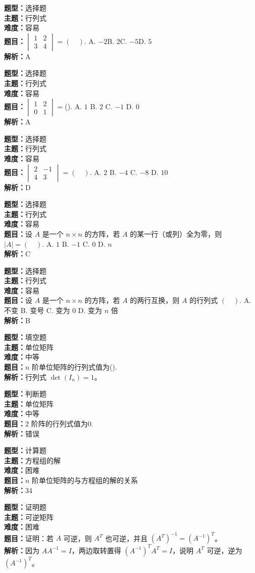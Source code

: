 \documentclass{ctexart}
\newenvironment{question}[5]{%
	\noindent\textbf{题型：}#1\\
	\textbf{主题：}#2\\
	\textbf{难度：}#3\\
	\textbf{题目：}#4\\
	\textbf{解析：}#5\\
	\vspace{1em}
}{}
\begin{document}
	\begin{question}
		{选择题}
		{行列式}
		{容易}
		{$\begin{vmatrix}1 & 2  \\ 3 & 4   \end{vmatrix}=(\quad).$
			A. $-2$\quad B. $2$\quad C. $-5$\quad D. $5$}
		{A}
	\end{question}
	
	\begin{question}
		{选择题}
		{行列式}
		{容易}
		{$\begin{vmatrix}1 & 2 \\ 0 & 1\end{vmatrix} = $(\quad\quad).
			A. $1$ \quad  B. $2$ \quad  C. $-1$  \quad D. $0$}
		{A}
	\end{question}
	
	\begin{question}
		{选择题}
		{行列式}
		{容易}
		{$\begin{vmatrix}2 & -1 \\ 4 & 3 \end{vmatrix}=(\quad).$ A. $2$ \quad B. $-4$ \quad C. $-8$ \quad D. $10$}
		{D}
	\end{question}
	
	\begin{question}
		{选择题}
		{行列式}
		{容易}
		{设 $A$ 是一个 $n \times n$ 的方阵，若 $A$ 的某一行（或列）全为零，则 $\left| A \right|=(\quad).$ 
			A. $1$ \quad B. $-1$ \quad C. $0$ \quad D. $n$  }
		{C}
	\end{question}
	
	\begin{question}
		{选择题}
		{行列式}
		{容易}
		{设 $A$ 是一个 $n \times n$ 的方阵，若 $A$ 的两行互换，则 $ A $ 的行列式 $(\quad).$
			A. 不变 \quad B. 变号 \quad C. 变为 $0$ \quad D. 变为 $n$ 倍  }
		{B}
	\end{question}
	
	\begin{question}
		{填空题}
		{单位矩阵}
		{中等}
		{$ n $ 阶单位矩阵的行列式值为(\quad\quad\quad).}
		{行列式 $ \det(I_n) = 1 $。}
	\end{question}
	
	\begin{question}
		{判断题}
		{单位矩阵}
		{中等}
		{$ 2 $ 阶阵的行列式值为0.}
		{错误}
	\end{question}
	
	\begin{question}
		{计算题}
		{方程组的解}
		{困难}
		{$ n $ 阶单位矩阵的与方程组的解的关系}
		{34}
	\end{question}
	
	\begin{question}
		{证明题}
		{可逆矩阵}
		{困难}
		{证明：若 $ A $ 可逆，则 $ A^T $ 也可逆，并且 $ (A^T)^{-1} = (A^{-1})^T $。}
		{因为 $ A A^{-1} = I $，两边取转置得 $ (A^{-1})^T A^T = I $，说明 $ A^T $ 可逆，逆为 $ (A^{-1})^T $。}
	\end{question}
\end{document}
